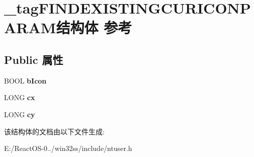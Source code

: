 \hypertarget{struct__tag_f_i_n_d_e_x_i_s_t_i_n_g_c_u_r_i_c_o_n_p_a_r_a_m}{}\section{\+\_\+tag\+F\+I\+N\+D\+E\+X\+I\+S\+T\+I\+N\+G\+C\+U\+R\+I\+C\+O\+N\+P\+A\+R\+A\+M结构体 参考}
\label{struct__tag_f_i_n_d_e_x_i_s_t_i_n_g_c_u_r_i_c_o_n_p_a_r_a_m}
\subsection*{Public 属性}
\begin{DoxyCompactItemize}
\item 
\mbox{\label{struct__tag_f_i_n_d_e_x_i_s_t_i_n_g_c_u_r_i_c_o_n_p_a_r_a_m_a41aa66d67d71bc831c1a624cb7dc4878}} 
B\+O\+OL {\bfseries b\+Icon}
\item 
\mbox{\label{struct__tag_f_i_n_d_e_x_i_s_t_i_n_g_c_u_r_i_c_o_n_p_a_r_a_m_a0d1463784c9e6b007ca8ca6ab55bc654}} 
L\+O\+NG {\bfseries cx}
\item 
\mbox{\label{struct__tag_f_i_n_d_e_x_i_s_t_i_n_g_c_u_r_i_c_o_n_p_a_r_a_m_af80d3cd00009f3fcfa9d27e823d2d0c4}} 
L\+O\+NG {\bfseries cy}
\end{DoxyCompactItemize}


该结构体的文档由以下文件生成\+:\begin{DoxyCompactItemize}
\item 
E\+:/\+React\+O\+S-\/0../win32ss/include/ntuser.\+h\end{DoxyCompactItemize}
